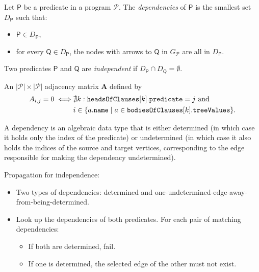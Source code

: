 \documentclass[runningheads]{llncs}
\newcommand{\variable}[1]{\texttt{\textup{#1}}}
\newcommand{\predicates}{\mathcal{P}}
\begin{document}
\begin{definition}
  Let $\mathsf{P}$ be a predicate in a program $\mathscr{P}$. The
  \emph{dependencies} of $\mathsf{P}$ is the smallest set $D_{\mathsf{P}}$ such
  that:
  \begin{itemize}
  \item $\mathsf{P} \in D_{\mathsf{P}}$,
  \item for every $\mathsf{Q} \in D_{\mathsf{P}}$, the nodes with arrows to
    $\mathsf{Q}$ in $G_{\mathscr{P}}$ are all in $D_{\mathsf{P}}$.
  \end{itemize}
\end{definition}

\begin{definition}
  Two predicates $\mathsf{P}$ and $\mathsf{Q}$ are \emph{independent} if
  $D_{\mathsf{P}} \cap D_{\mathsf{Q}} = \emptyset$.
\end{definition}

\begin{definition}
  An $|\predicates{}| \times |\predicates{}|$ adjacency matrix $\mathbf{A}$
  defined by
  \begin{align*}
    A_{i,j} = 0 \iff &\nexists k: \variable{headsOfClauses}[k].\variable{predicate} = j \text{ and } \\
    &i \in \{ a.\variable{name} \mid a \in \variable{bodiesOfClauses}[k].\variable{treeValues} \}.
  \end{align*}
\end{definition}

A dependency is an algebraic data type that is either determined (in which case
it holds only the index of the predicate) or undetermined (in which case it also
holds the indices of the source and target vertices, corresponding to the edge
responsible for making the dependency undetermined).

Propagation for independence:
\begin{itemize}
\item Two types of dependencies: determined and
  one-undetermined-edge-away-from-being-determined.
\item Look up the dependencies of both predicates. For each pair of
  matching dependencies:
  \begin{itemize}
  \item If both are determined, fail.
  \item If one is determined, the selected edge of the other must not
    exist.
  \end{itemize}
\end{itemize}
\end{document}
